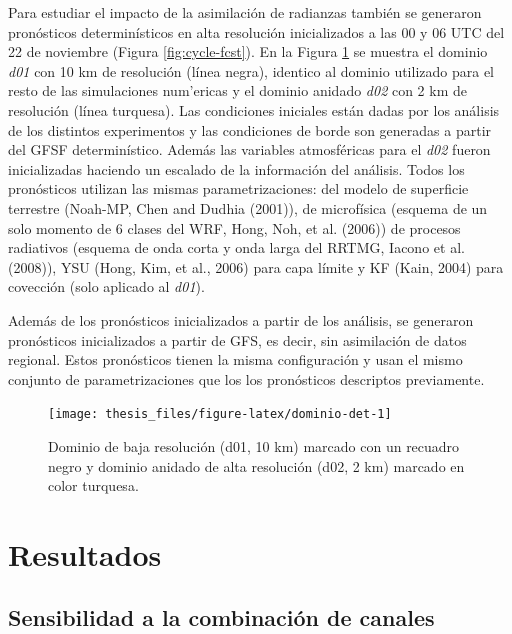\documentclass[12pt,oneside]{reedthesis}
\begin{document}
Para estudiar el impacto de la asimilación de radianzas también se generaron pronósticos determinísticos en alta resolución inicializados a las 00 y 06 UTC del 22 de noviembre (Figura \ref{fig:cycle-fcst}). En la Figura \ref{fig:dominio-det} se muestra el dominio \emph{d01} con 10 km de resolución (línea negra), identico al dominio utilizado para el resto de las simulaciones num'ericas y el dominio anidado \emph{d02} con 2 km de resolución (línea turquesa). Las condiciones iniciales están dadas por los análisis de los distintos experimentos y las condiciones de borde son generadas a partir del GFSF determinístico. Además las variables atmosféricas para el \emph{d02} fueron inicializadas haciendo un escalado de la información del análisis. Todos los pronósticos utilizan las mismas parametrizaciones: del modelo de superficie terrestre (Noah-MP, Chen and Dudhia (2001)), de microfísica (esquema de un solo momento de 6 clases del WRF, Hong, Noh, et al. (2006)) de procesos radiativos (esquema de onda corta y onda larga del RRTMG, Iacono et al. (2008)), YSU (Hong, Kim, et al., 2006) para capa límite y KF (Kain, 2004) para covección (solo aplicado al \emph{d01}).

Además de los pronósticos inicializados a partir de los análisis, se generaron pronósticos inicializados a partir de GFS, es decir, sin asimilación de datos regional. Estos pronósticos tienen la misma configuración y usan el mismo conjunto de parametrizaciones que los los pronósticos descriptos previamente.


\begin{figure}

{\centering \texttt{[image: thesis\_files/figure-latex/dominio-det-1]} 

}

\caption{Dominio de baja resolución (d01, 10 km) marcado con un recuadro negro y dominio anidado de alta resolución (d02, 2 km) marcado en color turquesa.}\label{fig:dominio-det}
\end{figure}
\hypertarget{resultados-2}{%
\section{Resultados}\label{resultados-2}}

\hypertarget{canales}{%
\subsection{Sensibilidad a la combinación de canales}\label{canales}}
\end{document}
